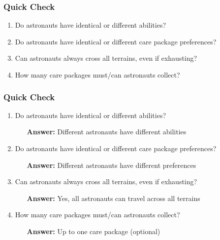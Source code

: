 \documentclass{beamer}
\begin{document}
\begin{frame}
\frametitle{Quick Check}
\begin{enumerate}
    \item Do astronauts have identical or different abilities?
    \vspace{0.5cm}
    \item Do astronauts have identical or different care package preferences?
    \vspace{0.5cm}
    \item Can astronauts always cross all terrains, even if exhausting?
    \vspace{0.5cm}
    \item How many care packages must/can astronauts collect?
\end{enumerate}
\end{frame}

\begin{frame}
\frametitle{Quick Check}
\begin{enumerate}
    \item Do astronauts have identical or different abilities?
    \begin{itemize}
        \item[\textbf{Answer:}] Different astronauts have different abilities
    \end{itemize}
    \vspace{0.3cm}
    \item Do astronauts have identical or different care package preferences?
    \begin{itemize}
        \item[\textbf{Answer:}] Different astronauts have different preferences
    \end{itemize}
    \vspace{0.3cm}
    \item Can astronauts always cross all terrains, even if exhausting?
    \begin{itemize}
        \item[\textbf{Answer:}] Yes, all astronauts can travel across all terrains
    \end{itemize}
    \vspace{0.3cm}
    \item How many care packages must/can astronauts collect?
    \begin{itemize}
        \item[\textbf{Answer:}] Up to one care package (optional)
    \end{itemize}
\end{enumerate}
\end{frame}
\end{document}
